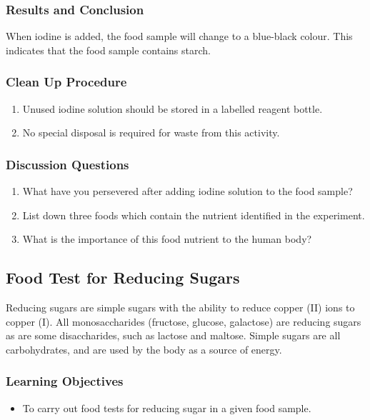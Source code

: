 \subsubsection*{Results and Conclusion}
When iodine is added, the food sample will change to a blue-black colour. This indicates that the food sample contains starch.

\subsubsection*{Clean Up Procedure}
\begin{enumerate}
\item{Unused iodine solution should be stored in a labelled reagent bottle.}
\item{No special disposal is required for waste from this activity.}
\end{enumerate}

\subsubsection*{Discussion Questions}
\begin{enumerate}
\item{What have you persevered after adding iodine solution to the food sample?}
\item{List down three foods which contain the nutrient identified in the experiment.}
\item{What is the importance of this food nutrient to the human body?}
\end{enumerate}

\subsection{Food Test for Reducing Sugars}
Reducing sugars are simple sugars with the ability to reduce copper (II) ions to copper (I). All monosaccharides (fructose, glucose, galactose) are reducing sugars as are some disaccharides, such as lactose and maltose. Simple sugars are all carbohydrates, and are used by the body as a source of energy.

\subsubsection*{Learning Objectives}
\begin{itemize}
\item{To carry out food tests for reducing sugar in a given food sample.}
\end{itemize}

